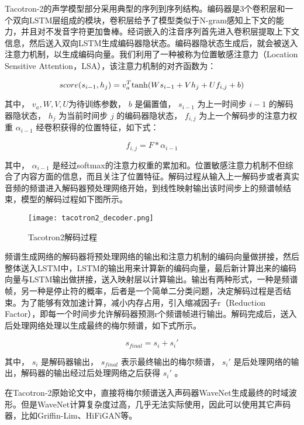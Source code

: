 \documentclass[cn,10pt,math=newtx,citestyle=gb7714-2015,bibstyle=gb7714-2015]{elegantbook}
\begin{document}
Tacotron-2的声学模型部分采用典型的序列到序列结构。编码器是3个卷积层和一个双向LSTM层组成的模块，卷积层给予了模型类似于N-gram感知上下文的能力，并且对不发音字符更加鲁棒。经词嵌入的注音序列首先进入卷积层提取上下文信息，然后送入双向LSTM生成编码器隐状态。编码器隐状态生成后，就会被送入注意力机制，以生成编码向量。我们利用了一种被称为位置敏感注意力（Location Sensitive Attention，LSA），该注意力机制的对齐函数为：

\begin{equation}
  score(s_{i-1},h_j)=v_a^T{\rm tanh}(Ws_{i-1}+Vh_j+Uf_{i,j}+b)
\end{equation}

其中， $v_a,W,V,U$为待训练参数， $b$ 是偏置值， $s_{i-1}$ 为上一时间步 $i-1$ 的解码器隐状态， $h_j$ 为当前时间步 $j$ 的编码器隐状态， $f_{i,j}$ 为上一个解码步的注意力权重 $\alpha_{i-1}$ 经卷积获得的位置特征，如下式：

\begin{equation}
  f_{i,j}=F*\alpha_{i-1}
\end{equation}

其中， $\alpha_{i-1}$ 是经过softmax的注意力权重的累加和。位置敏感注意力机制不但综合了内容方面的信息，而且关注了位置特征。解码过程从输入上一解码步或者真实音频的频谱进入解码器预处理网络开始，到线性映射输出该时间步上的频谱帧结束，模型的解码过程如下图所示。

\begin{figure}[htbp]
  \centering
  \texttt{[image: tacotron2\_decoder.png]}
  \caption{Tacotron2解码过程 \label{fig:tacotron2_decoder}}
\end{figure}

频谱生成网络的解码器将预处理网络的输出和注意力机制的编码向量做拼接，然后整体送入LSTM中，LSTM的输出用来计算新的编码向量，最后新计算出来的编码向量与LSTM输出做拼接，送入映射层以计算输出。输出有两种形式，一种是频谱帧，另一种是停止符的概率，后者是一个简单二分类问题，决定解码过程是否结束。为了能够有效加速计算，减小内存占用，引入缩减因子r（Reduction Factor），即每一个时间步允许解码器预测r个频谱帧进行输出。解码完成后，送入后处理网络处理以生成最终的梅尔频谱，如下式所示。

\begin{equation}
  s_{final}=s_i+s_i'
\end{equation}

其中， $s_i$ 是解码器输出， $s_{final}$ 表示最终输出的梅尔频谱， $s_i'$ 是后处理网络的输出，解码器的输出经过后处理网络之后获得 $s_i'$ 。

在Tacotron-2原始论文中，直接将梅尔频谱送入声码器WaveNet生成最终的时域波形。但是WaveNet计算复杂度过高，几乎无法实际使用，因此可以使用其它声码器，比如Griffin-Lim、HiFiGAN等。
\end{document}
